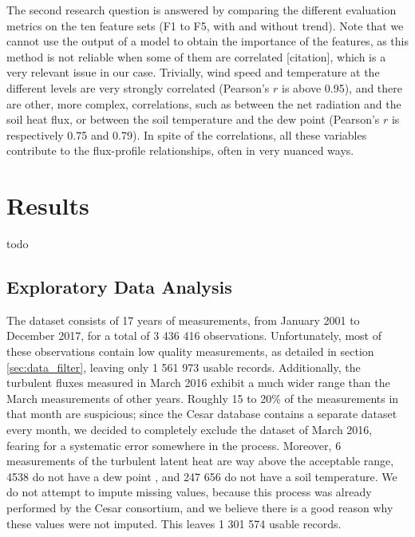 \documentclass[12pt]{book}
\begin{document}
The second research question is answered by comparing the different evaluation metrics on the ten feature sets (F1 to F5, with and without trend). Note that we cannot use the output of a model to obtain the importance of the features, as this method is not reliable when some of them are correlated [citation], which is a very relevant issue in our case. Trivially, wind speed and temperature at the different levels are very strongly correlated (Pearson's $r$ is above 0.95), and there are other, more complex, correlations, such as between the net radiation and the soil heat flux, or between the soil temperature and the dew point (Pearson's $r$ is respectively 0.75 and 0.79). In spite of the correlations, all these variables contribute to the flux-profile relationships, often in very nuanced ways.



\chapter{Results}
todo

\section{Exploratory Data Analysis}
The dataset consists of 17 years of measurements, from January 2001 to December 2017, for a total of 3 436 416 observations. Unfortunately, most of these observations contain low quality measurements, as detailed in section \ref{sec:data_filter}, leaving only  1 561 973 usable records. Additionally, the turbulent fluxes measured in March 2016 exhibit a much wider range than the March measurements of other years. Roughly 15 to 20\% of the measurements in that month are suspicious; since the Cesar database contains a separate dataset every month, we decided to completely exclude the dataset of March 2016, fearing for a systematic error somewhere in the process. Moreover, 6 measurements of the turbulent latent heat are way above the acceptable range, 4538 do not have a dew point , and 247 656 do not have a soil temperature. We do not attempt to impute missing values, because this process was already performed by the Cesar consortium, and we believe there is a good reason why these values were not imputed. This leaves 1 301 574 usable records.
\end{document}

